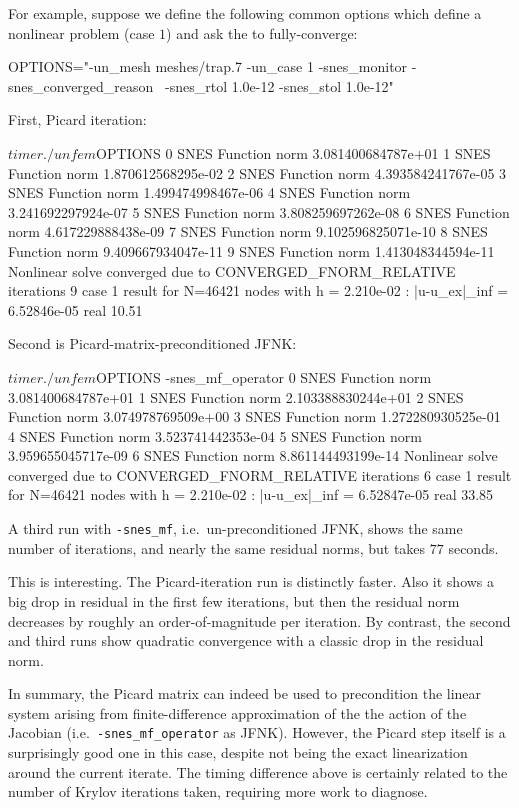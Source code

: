 For example, suppose we define the following common options which define a nonlinear problem (case $1$) and ask the \pSNES to fully-converge:
\begin{code}
OPTIONS="-un_mesh meshes/trap.7 -un_case 1 -snes_monitor -snes_converged_reason \
 -snes_rtol 1.0e-12 -snes_stol 1.0e-12"
\end{code}
First, Picard iteration:
\begin{cline}
$ timer ./unfem $OPTIONS
  0 SNES Function norm 3.081400684787e+01 
  1 SNES Function norm 1.870612568295e-02 
  2 SNES Function norm 4.393584241767e-05 
  3 SNES Function norm 1.499474998467e-06 
  4 SNES Function norm 3.241692297924e-07 
  5 SNES Function norm 3.808259697262e-08 
  6 SNES Function norm 4.617229888438e-09 
  7 SNES Function norm 9.102596825071e-10 
  8 SNES Function norm 9.409667934047e-11 
  9 SNES Function norm 1.413048344594e-11 
Nonlinear solve converged due to CONVERGED_FNORM_RELATIVE iterations 9
case 1 result for N=46421 nodes with h = 2.210e-02 :  |u-u_ex|_inf = 6.52846e-05
real 10.51
\end{cline}
Second is Picard-matrix-preconditioned JFNK:
\begin{cline}
$ timer ./unfem $OPTIONS -snes_mf_operator
  0 SNES Function norm 3.081400684787e+01 
  1 SNES Function norm 2.103388830244e+01 
  2 SNES Function norm 3.074978769509e+00 
  3 SNES Function norm 1.272280930525e-01 
  4 SNES Function norm 3.523741442353e-04 
  5 SNES Function norm 3.959655045717e-09 
  6 SNES Function norm 8.861144493199e-14 
Nonlinear solve converged due to CONVERGED_FNORM_RELATIVE iterations 6
case 1 result for N=46421 nodes with h = 2.210e-02 :  |u-u_ex|_inf = 6.52847e-05
real 33.85
\end{cline}
A third run with \texttt{-snes\_mf}, i.e.~un-preconditioned JFNK, shows the same number of iterations, and nearly the same residual norms, but takes $77$ seconds.

This is interesting.  The Picard-iteration run is distinctly faster.  Also it shows a big drop in residual in the first few iterations, but then the residual norm decreases by roughly an order-of-magnitude per iteration.  By contrast, the second and third runs show quadratic convergence with a classic drop in the residual norm.

In summary, the Picard matrix can indeed be used to precondition the linear system arising from finite-difference approximation of the the action of the Jacobian (i.e.~\texttt{-snes\_mf\_operator} as JFNK).  However, the Picard step itself is a surprisingly good one in this case, despite not being the exact linearization around the current iterate.  The timing difference above is certainly related to the number of Krylov iterations taken, requiring more work to diagnose.

